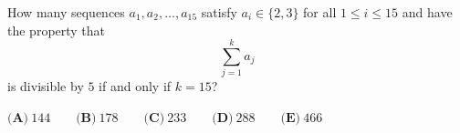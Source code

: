 How many sequences $a_1,a_2,\dots,a_{15}$ satisfy $a_i\in\{2,3\}$ for all $1\le i\le15$ and have the property that
\[\sum_{j=1}^{k}a_j\]
is divisible by $5$ if and only if $k=15$?

$\textbf{(A)}\ 144 \qquad\textbf{(B)}\ 178 \qquad\textbf{(C)}\ 233 \qquad\textbf{(D)}\ 288 \qquad\textbf{(E)}\ 466$
